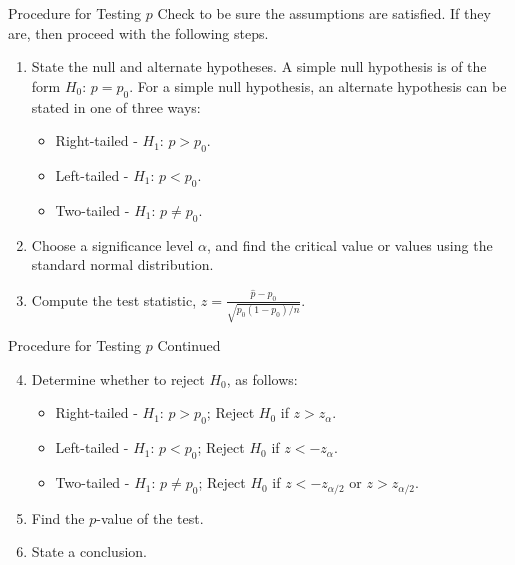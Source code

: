 \documentclass[pdf]{beamer}
\theoremstyle{remark}
\theoremstyle{definition}
\begin{document}
\begin{frame}[t]{Procedure for Testing $p$ }
Check to be sure the assumptions are satisfied. If they are, then proceed with the following steps. \\
\vspace{1.5ex}
\begin{enumerate}
\item State the null and alternate hypotheses. A simple null hypothesis is of the form $H_0\text{: }  p = p_0$. For a simple null hypothesis, an alternate hypothesis can be stated in one of three ways:
 \begin{itemize}
  \item Right-tailed - $H_1\text{: }  p > p_0$.
  \item Left-tailed - $H_1\text{: }  p < p_0$.
  \item Two-tailed - $H_1\text{: }  p \ne p_0$.
\end{itemize}
\item Choose a significance level $\alpha$, and find the critical value or values using the standard normal distribution.
\item Compute the test statistic, $z =\frac{\hat{p} - p_0}{\sqrt{p_0(1-p_0)/ n}}$.  
\end{enumerate}
\end{frame}

\begin{frame}[t]{Procedure for Testing $p$ Continued}
\begin{enumerate}
  \setcounter{enumi}{3}
\item Determine whether to reject $H_0$, as follows:
 \begin{itemize}
  \item Right-tailed - $H_1\text{: }  p > p_0$; Reject $H_0$ if $z > z_{\alpha}$.
  \item Left-tailed - $H_1\text{: }  p < p_0$; Reject $H_0$ if $z < -z_{\alpha}$.
  \item Two-tailed - $H_1\text{: }  p \ne p_0$; Reject $H_0$ if $z < -z_{\alpha/2}$ or $z > z_{\alpha/2}$.
\end{itemize}
\item Find the $p$-value of the test. 
\item State a conclusion.
\end{enumerate}
\end{frame}
\end{document}
